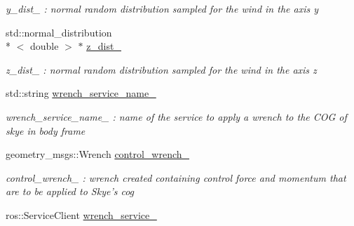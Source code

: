 \begin{DoxyCompactItemize}
\begin{DoxyCompactList}\small\item\em y\-\_\-dist\-\_\- \-: normal random distribution sampled for the wind in the axis y \end{DoxyCompactList}\item 
\hypertarget{class_pose_controller_node_af11b48d667f359e8bafeba73960290bb}{std\-::normal\-\_\-distribution\\*
$<$ double $>$ $\ast$ \hyperlink{class_pose_controller_node_af11b48d667f359e8bafeba73960290bb}{z\-\_\-dist\-\_\-}}\label{class_pose_controller_node_af11b48d667f359e8bafeba73960290bb}

\begin{DoxyCompactList}\small\item\em z\-\_\-dist\-\_\- \-: normal random distribution sampled for the wind in the axis z \end{DoxyCompactList}\item 
\hypertarget{class_pose_controller_node_a08dd15cd789e2740acba47276df91755}{std\-::string \hyperlink{class_pose_controller_node_a08dd15cd789e2740acba47276df91755}{wrench\-\_\-service\-\_\-name\-\_\-}}\label{class_pose_controller_node_a08dd15cd789e2740acba47276df91755}

\begin{DoxyCompactList}\small\item\em wrench\-\_\-service\-\_\-name\-\_\- \-: name of the service to apply a wrench to the C\-O\-G of skye in body frame \end{DoxyCompactList}\item 
\hypertarget{class_pose_controller_node_a030dca6c6dc2636e8afdd8e932fc03f4}{geometry\-\_\-msgs\-::\-Wrench \hyperlink{class_pose_controller_node_a030dca6c6dc2636e8afdd8e932fc03f4}{control\-\_\-wrench\-\_\-}}\label{class_pose_controller_node_a030dca6c6dc2636e8afdd8e932fc03f4}

\begin{DoxyCompactList}\small\item\em control\-\_\-wrench\-\_\- \-: wrench created containing control force and momentum that are to be applied to Skye's cog \end{DoxyCompactList}\item 
\hypertarget{class_pose_controller_node_aa178fbda0e6eba718bce52c1ee9656a8}{ros\-::\-Service\-Client \hyperlink{class_pose_controller_node_aa178fbda0e6eba718bce52c1ee9656a8}{wrench\-\_\-service\-\_\-}}\label{class_pose_controller_node_aa178fbda0e6eba718bce52c1ee9656a8}


\end{DoxyCompactItemize}
